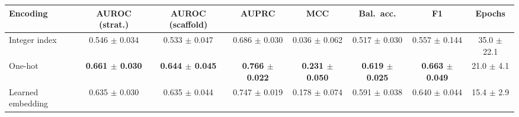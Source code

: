 \begin{tabular}{lccccccc}
\toprule
Encoding & AUROC (strat.) & AUROC (scaffold) & AUPRC & MCC & Bal.\ acc. & F1 & Epochs \\
\midrule
Integer index & 0.546 $\pm$ 0.034 & 0.533 $\pm$ 0.047 & 0.686 $\pm$ 0.030 & 0.036 $\pm$ 0.062 & 0.517 $\pm$ 0.030 & 0.557 $\pm$ 0.144 & 35.0 $\pm$ 22.1 \\
One-hot & \textbf{0.661 $\pm$ 0.030} & \textbf{0.644 $\pm$ 0.045} & \textbf{0.766 $\pm$ 0.022} & \textbf{0.231 $\pm$ 0.050} & \textbf{0.619 $\pm$ 0.025} & \textbf{0.663 $\pm$ 0.049} & 21.0 $\pm$ 4.1 \\
Learned embedding & 0.635 $\pm$ 0.030 & 0.635 $\pm$ 0.044 & 0.747 $\pm$ 0.019 & 0.178 $\pm$ 0.074 & 0.591 $\pm$ 0.038 & 0.640 $\pm$ 0.044 & 15.4 $\pm$ 2.9 \\
\bottomrule
\end{tabular}